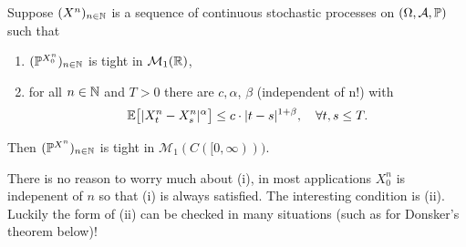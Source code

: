 \begin{lAussageWerkzeug}
\begin{theorem}\label{thm:KolTightness}
	Suppose $(X^n)_{n\in\mathbb{N}}$ is a sequence of continuous stochastic processes on $(\Omega,\mathcal{A},\mathbb{P})$ such that
	\begin{enumerate}[label=(\roman*)]
		\item $(\mathbb P^{X_0^n})_{n\in\mathbb{N}}$ is tight in $\mathcal M_1(\mathbb{R})$,
  		\item for all $n\in\mathbb{N}$ and $T>0$ there are $c, \alpha$, $\beta$ (independent of n!) with
	  \begin{align*}
		  \mathbb{E}\big[\lvert X_t^n - X_s^n \rvert^{\alpha}\big] \leq c \cdot \lvert t - s \rvert^{1+\beta},\quad \forall t,s \leq T.
  	\end{align*}
	\end{enumerate}
	Then $(\mathbb P^{X^n})_{n\in\mathbb{N}}$ is tight in $\mathcal M_1(C([0,\infty)))$.
\end{theorem}
\end{lAussageWerkzeug}
There is no reason to worry much about (i), in most applications $X_0^n$ is indepenent of $n$ so that (i) is always satisfied. The interesting condition is (ii). Luckily the form of (ii) can be checked in many situations (such as for Donsker's theorem below)!
